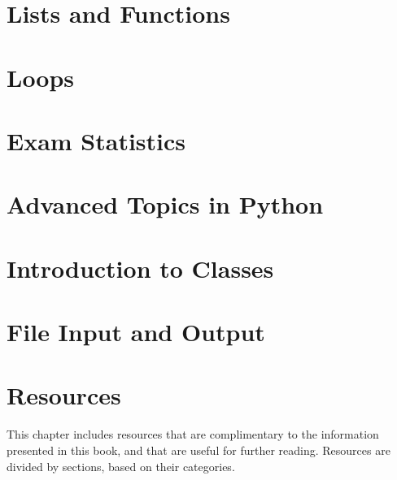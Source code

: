 \documentclass[12pt,a4paper,final,twoside,onecolumn,titlepage]{book}
\begin{document}
\chapter{Lists and Functions}

\chapter{Loops}

\chapter{Exam Statistics}

\chapter{Advanced Topics in Python}

\chapter{Introduction to Classes}

\chapter{File Input and Output}



\appendix
\renewcommand\chaptername{Appendix}
\chapter{Resources}
This chapter includes resources that are complimentary to the information presented in this book, and that are useful for further reading. Resources are divided by sections, based on their categories.
\end{document}
